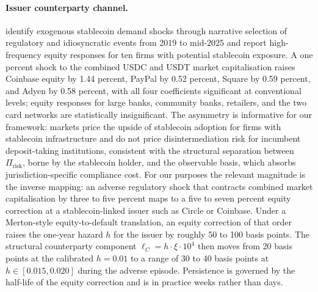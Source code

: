 \paragraph{Issuer counterparty channel.} \citet{cerutti_firat_hengge_sagawa_2026} identify exogenous stablecoin demand shocks through narrative selection of regulatory and idiosyncratic events from 2019 to mid-2025 and report high-frequency equity responses for ten firms with potential stablecoin exposure. A one percent shock to the combined USDC and USDT market capitalisation raises Coinbase equity by 1.44 percent, PayPal by 0.52 percent, Square by 0.59 percent, and Adyen by 0.58 percent, with all four coefficients significant at conventional levels; equity responses for large banks, community banks, retailers, and the two card networks are statistically insignificant. The asymmetry is informative for our framework: markets price the upside of stablecoin adoption for firms with stablecoin infrastructure and do not price disintermediation risk for incumbent deposit-taking institutions, consistent with the structural separation between $\Pi_{\text{risk}}$, borne by the stablecoin holder, and the observable basis, which absorbs jurisdiction-specific compliance cost. For our purposes the relevant magnitude is the inverse mapping: an adverse regulatory shock that contracts combined market capitalisation by three to five percent maps to a five to seven percent equity correction at a stablecoin-linked issuer such as Circle or Coinbase. Under a Merton-style equity-to-default translation, an equity correction of that order raises the one-year hazard $h$ for the issuer by roughly 50 to 100 basis points. The structural counterparty component $\ell_C = h \cdot \xi \cdot 10^4$ then moves from 20 basis points at the calibrated $h = 0.01$ to a range of 30 to 40 basis points at $h \in [0.015, 0.020]$ during the adverse episode. Persistence is governed by the half-life of the equity correction and is in practice weeks rather than days.

